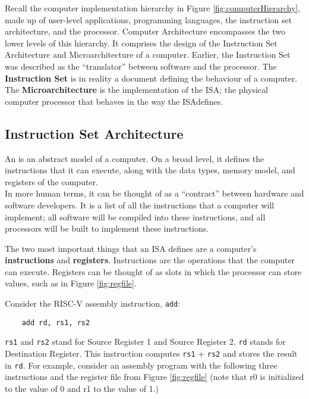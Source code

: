 
Recall the computer implementation hierarchy in Figure \ref{fig:computerHierarchy}, made up of user-level applications, programming languages, the instruction set architecture, and the processor. Computer Architecture encompasses the two lower levels of this hierarchy. It comprises the design of the Instruction Set Architecture and Microarchitecture of a computer. Earlier, the Instruction Set was described as the ``translator'' between software and the processor. The \textbf{Instruction Set} is in reality a document defining the behaviour of a computer. The \textbf{Microarchitecture} is the implementation of the \gls{ISA}; the physical computer processor that behaves in the way the \gls{ISA}defines.



\subsection{Instruction Set Architecture}
    An  is an abstract model of a computer. On a broad level, it defines the instructions that it can execute, along with the data types, memory model, and registers of the computer. \\
    In more human terms, it can be thought of as a ``contract'' between hardware and software developers. It is a list of all the instructions that a computer will implement; all software will be compiled into these instructions, and all processors will be built to implement these instructions.

    

    The two most important things that an \gls{ISA} defines are a computer's \textbf{instructions} and \textbf{registers}.
    Instructions are the operations that the computer can execute. Registers can be thought of as slots in which the processor can store values, such as in Figure \ref{fig:regfile}. 

    

    \noindent Consider the RISC-V assembly instruction, \texttt{add}: 
    \begin{verbatim}
    add rd, rs1, rs2
    \end{verbatim}

    \noindent\texttt{rs1} and \texttt{rs2} stand for Source Register 1 and Source Register 2. \texttt{rd} stands for Destination Register. This instruction computes \texttt{rs1} $+$ \texttt{rs2} and stores the result in \texttt{rd}. For example, consider an assembly program with the following three instructions and the register file from Figure \ref{fig:regfile} (note that r0 is initialized to the value of 0 and r1 to the value of 1.)

